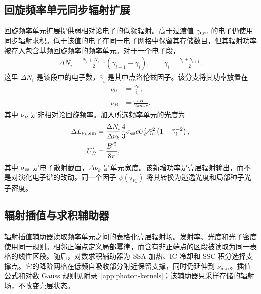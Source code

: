 \documentclass[twocolumn]{aastex702}
\begin{document}
\subsection{回旋频率单元同步辐射扩展}

回旋频率单元扩展提供弱相对论电子的低频辐射。高于过渡值 \(\gamma_{\rm cyc}\) 的电子仍使用同步辐射求积。低于该值的电子在同一电子网格中保留其存储数目，但其辐射功率被存入包含基频回旋频率的频率单元。对于一个电子段，
\begin{equation}
\begin{aligned}
\Delta N_i=\frac{N_i+N_{i+1}}{2}(\gamma_{i+1}-\gamma_i),
\qquad
\bar\gamma_i=\frac{\gamma_i+\gamma_{i+1}}{2}.
\end{aligned}
\end{equation}
这里 \(\Delta N_i\) 是该段中的电子数，\(\bar\gamma_i\) 是其中点洛伦兹因子。该分支将其功率放置在
\begin{equation}
\begin{aligned}
\nu_0&=\frac{\nu_B}{\bar\gamma_i},\\
\nu_B&=\frac{eB'}{2\pi m_e c}.
\end{aligned}
\end{equation}
其中 \(\nu_B\) 是非相对论回旋频率。加入所选频率单元的光度为
\begin{equation}
\begin{aligned}
\Delta L_{\nu_k,{\rm em}}&=
\frac{\Delta N_i}{\Delta\nu_k}
\frac{4}{3}\sigma_{\rm es}cU'_B
\bar\gamma_i^2
\left(1-\bar\gamma_i^{-2}\right),\\
U'_B&=\frac{B'^2}{8\pi},
\end{aligned}
\end{equation}
其中 \(\sigma_{\rm es}\) 是电子散射截面，\(\Delta\nu_k\) 是单元宽度。该新增功率是壳层辐射输出，而不是对演化电子谱的改动。同一个因子 \(\psi(\tau_{\nu_k})\) 将其转换为逃逸光度和局部种子光子密度。

\subsection{辐射插值与求积辅助器}
\label{sec:positive-field-interpolation}

辐射插值辅助器读取频率单元之间的表格化壳层辐射场。发射率、光度和光子密度使用同一规则。相邻正端点定义局部幂律，而含有非正端点的区段被读取为同一表格的线性区段。随后，对数求积辅助器为 SSA 加热、IC 冷却和 SSC 积分选择支撑点。它的降阶网格在低频自吸收部分附近保留支撑，同时仍延伸到 \(\nu_{\max}\)。插值公式和对数 Gauss 规则见附录~\ref{app:photon-kernels}；该辅助器只采样存储的辐射场，不改变壳层状态。
\end{document}
